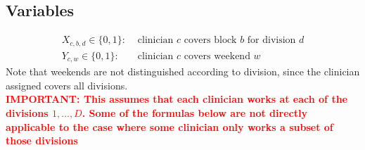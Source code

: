 \documentclass[]{article}
\begin{document}
\subsection{Variables}
	\begin{align}
		X_{c, b, d} \in \{0, 1\}: &\text{ clinician $c$ covers block $b$ for division $d$} \\
		Y_{c, w} \in \{0, 1\}: &\text{ clinician $c$ covers weekend $w$}
	\end{align}
Note that weekends are not distinguished according to division, since the clinician assigned covers all divisions. \\

\textcolor{red}{\textbf{IMPORTANT: This assumes that each clinician works at each of the divisions $1, \ldots, D$. Some of the formulas below are not directly applicable to the case where some clinician only works a subset of those divisions}}
\end{document}

